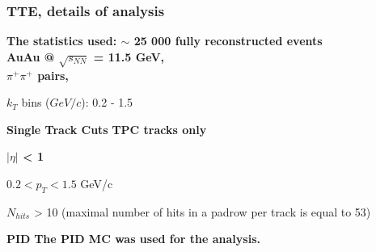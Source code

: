 \documentclass[dvipsnames] {beamer}
\begin{document}
\begin{frame}
   \frametitle{\bf \centering TTE, details of analysis}
  \begin{block}{}
    \bf 
    The statistics used: $\sim$ 25 000 fully reconstructed events
    \\
    AuAu @ $\sqrt{s_{NN}}$ = 11.5 GeV,
    \\
    $\pi^{+}\pi^{+}$ pairs,


    $k_{T}$ bins ($ GeV/c $): 0.2 - 1.5
    
  \end{block}


    \begin{block}{\bf \centering Single Track Cuts}
      \bf TPC tracks only
      
     \bf  $|\eta|$ < 1

      $ 0.2 < p_{T} < 1.5$ GeV/c

     $N_{hits}$ > 10 (maximal number of hits in a padrow per track is equal to 53)
    \end{block}

     \begin{block}{\bf \centering PID}
       \bf The PID MC was used for the analysis.
     \end{block}
\end{frame}
\end{document}
